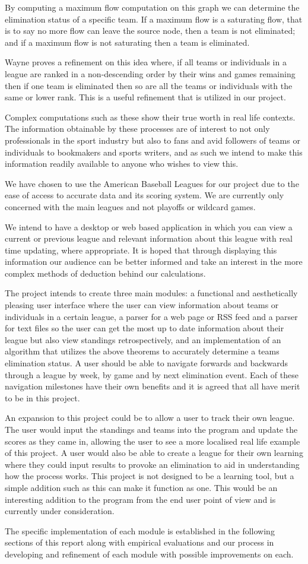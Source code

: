 \documentclass{report}
\begin{document}
By computing a maximum flow computation on this graph we can determine the elimination status of a specific team. If a maximum flow is a saturating flow, that is to say no more flow can leave the source node, then a team is not eliminated; and if a maximum flow is not saturating then a team is eliminated.

Wayne proves a refinement on this idea where, if all teams or individuals in a league are ranked in a non-descending order by their wins and games remaining then if one team is eliminated then so are all the teams or individuals with the same or lower rank. This is a useful refinement that is utilized in our project. 

\break
Complex computations such as these show their true worth in real life contexts. The information obtainable by these processes are of interest to not only professionals in the sport industry but also to fans and avid followers of teams or individuals to bookmakers and sports writers, and as such we intend to make this information readily available to anyone who wishes to view this. 

We have chosen to use the American Baseball Leagues for our project due to the ease of access to accurate data and its scoring system. We are currently only concerned with the main leagues and not playoffs or wildcard games.

We intend to have a desktop or web based application in which you can view a current or previous league and relevant information about this league with real time updating, where appropriate. It is hoped that through displaying this information our audience can be better informed and take an interest in the more complex methods of deduction behind our calculations.

The project intends to create three main modules: a functional and aesthetically pleasing user interface where the user can view information about teams or individuals in a certain league, a parser for a web page or RSS feed and a parser for text files so the user can get the most up to date information about their league but also view standings retrospectively, and an implementation of an algorithm that utilizes the above theorems to accurately determine a teams elimination status. A user should be able to navigate forwards and backwards through a league by week, by game and by next elimination event. Each of these navigation milestones have their own benefits and it is agreed that all have merit to be in this project.

An expansion to this project could be to allow a user to track their own league. The user would input the standings and teams into the program and update the scores as they came in, allowing the user to see a more localised real life example of this project. A user would also be able to create a league for their own learning where they could input results to provoke an elimination to aid in understanding how the process works. This project is not designed to be a learning tool, but a simple addition such as this can make it function as one. This would be an interesting addition to the program from the end user point of view and is currently under consideration. 

The specific implementation of each module is established in the following sections of this report along with empirical evaluations and our process in developing and refinement of each module with possible improvements on each.
\end{document}
